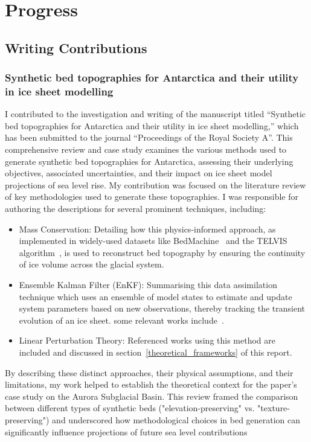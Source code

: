 \chapter{Progress}\label{progress}
\section{Writing Contributions}
\subsection{Synthetic bed topographies for Antarctica and their utility in ice sheet modelling}
I contributed to the investigation and writing of the manuscript titled ``Synthetic bed topographies for Antarctica and their utility in ice sheet modelling,'' which has been submitted to the journal ``Proceedings of the Royal Society A''. This comprehensive review and case study examines the various methods used to generate synthetic bed topographies for Antarctica, assessing their underlying objectives, associated uncertainties, and their impact on ice sheet model projections of sea level rise.
My contribution was focused on the literature review of key methodologies used to generate these topographies. I was responsible for authoring the descriptions for several prominent techniques, including:
\begin{itemize}
\item{Mass Conservation}: Detailing how this physics-informed approach, as implemented in widely-used datasets like BedMachine~\cite{Morlighem_2020} and the TELVIS algorithm~\cite{TELVIS_2011}, is used to reconstruct bed topography by ensuring the continuity of ice volume across the glacial system.
\item{Ensemble Kalman Filter (EnKF)}: Summarising this data assimilation technique which uses an ensemble of model states to estimate and update system parameters based on new observations, thereby tracking the transient evolution of an ice sheet. some relevant works include~\cite{Gillet-Chaulet_2020, Choi_2025}.
\item{Linear Perturbation Theory}: Referenced works using this method are included and discussed in section~\ref{theoretical_frameworks} of this report.
\end{itemize}
By describing these distinct approaches, their physical assumptions, and their limitations, my work helped to establish the theoretical context for the paper's case study on the Aurora Subglacial Basin. This review framed the comparison between different types of synthetic beds ("elevation-preserving" vs. "texture-preserving") and underscored how methodological choices in bed generation can significantly influence projections of future sea level contributions

